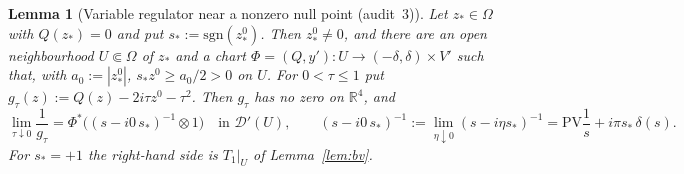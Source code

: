 \documentclass{article}
\newtheorem{lemma}[proposition]{Lemma}
\theoremstyle{remark}
\begin{document}
\begin{lemma}[Variable regulator near a nonzero null point (audit~3)]
\label{lem:wpA-varreg}
Let $z_\ast\in\Omega$ with $Q(z_\ast)=0$ and put $s_\ast:=\mathrm{sgn}(z_\ast^0)$.
Then $z^0_\ast\neq0$, and there are an open neighbourhood $U\Subset\Omega$ of $z_\ast$ and a chart $\Phi=(Q,y'):U\to(-\delta,\delta)\times V'$ such that, with $a_0:=|z^0_\ast|$, $s_\ast z^0\ge a_0/2>0$ on $U$.
For $0<\tau\le1$ put $g_\tau(z):=Q(z)-2i\tau z^0-\tau^2$.
Then $g_\tau$ has no zero on $\mathbb R^4$, and
\[
\lim_{\tau\downarrow0}\frac1{g_\tau}=\Phi^*\bigl((s-i0\,s_\ast)^{-1}\otimes1\bigr)
\quad\text{in }\mathcal D'(U),
\qquad
(s-i0\,s_\ast)^{-1}:=\lim_{\eta\downarrow0}(s-i\eta s_\ast)^{-1}=\mathrm{PV}\frac1s+i\pi s_\ast\,\delta(s).
\]
For $s_\ast=+1$ the right-hand side is $T_1|_U$ of Lemma~\ref{lem:bv}.
\end{lemma}
\end{document}
